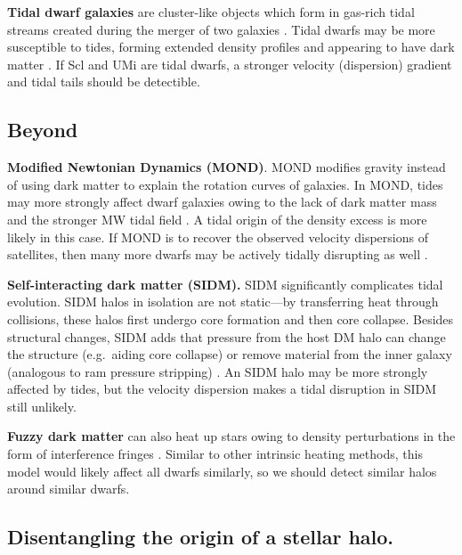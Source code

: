 \textbf{Tidal dwarf galaxies} are cluster-like objects which form in
gas-rich tidal streams created during the merger of two galaxies
\citep[e.g.,][]{mirabel+dottori+lutz1992, bournaud+duc2006}. Tidal
dwarfs may be more susceptible to tides, forming extended density
profiles and appearing to have dark matter
\citep{casas+2012, yang+2014, wang+2024a}. If Scl and UMi are tidal
dwarfs, a stronger velocity (dispersion) gradient and tidal tails should
be detectible.

\subsection{\texorpdfstring{Beyond \LCDM{}}{Beyond }}\label{beyond}

\textbf{Modified Newtonian Dynamics (MOND)}. MOND modifies gravity
instead of using dark matter to explain the rotation curves of galaxies.
In MOND, tides may more strongly affect dwarf galaxies owing to the lack
of dark matter mass and the stronger MW tidal field
\citep{mcgaugh+wolf2010, brada+milgrom2000}. A tidal origin of the
density excess is more likely in this case. If MOND is to recover the
observed velocity dispersions of satellites, then many more dwarfs may
be actively tidally disrupting as well
\citep{casas+2012, yang+2014, wang+2024a}.

\textbf{Self-interacting dark matter (SIDM).} SIDM significantly
complicates tidal evolution. SIDM halos in isolation are not static---by
transferring heat through collisions, these halos first undergo core
formation and then core collapse. Besides structural changes, SIDM adds
that pressure from the host DM halo can change the structure
(e.g.~aiding core collapse) or remove material from the inner galaxy
(analogous to ram pressure stripping) \citep[e.g.,][]{cartonzeng+2024}.
An SIDM halo may be more strongly affected by tides, but the velocity
dispersion makes a tidal disruption in SIDM still unlikely.

\textbf{Fuzzy dark matter} can also heat up stars owing to density
perturbations in the form of interference fringes
\citep[e.g.,][]{el-zant+2020, duttachowdhury+2023}. Similar to other
intrinsic heating methods, this model would likely affect all dwarfs
similarly, so we should detect similar halos around similar dwarfs.

\subsection{Disentangling the origin of a stellar
halo.}\label{disentangling-the-origin-of-a-stellar-halo.}

